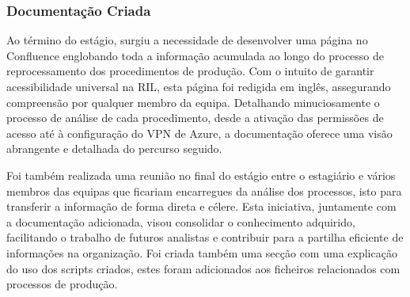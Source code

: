 
        \subsubsection{Documentação Criada}\label{secsec:documentação}
            
            Ao término do estágio, surgiu a necessidade de desenvolver uma página no Confluence englobando toda a informação acumulada ao longo do processo de reprocessamento dos procedimentos de produção. Com o intuito de garantir acessibilidade universal na RIL, esta página foi redigida em inglês, assegurando compreensão por qualquer membro da equipa. Detalhando minuciosamente o processo de análise de cada procedimento, desde a ativação das permissões de acesso até à configuração do VPN de Azure, a documentação oferece uma visão abrangente e detalhada do percurso seguido. 
            
            Foi também realizada uma reunião no final do estágio entre o estagiário e vários membros das equipas que ficariam encarregues da análise dos processos, isto para transferir a informação de forma direta e célere. Esta iniciativa, juntamente com a documentação adicionada, visou consolidar o conhecimento adquirido, facilitando o trabalho de futuros analistas e contribuir para a partilha eficiente de informações na organização. Foi criada também uma secção com uma explicação do uso dos scripts criados, estes foram adicionados aos ficheiros relacionados com processos de produção.

        
        



